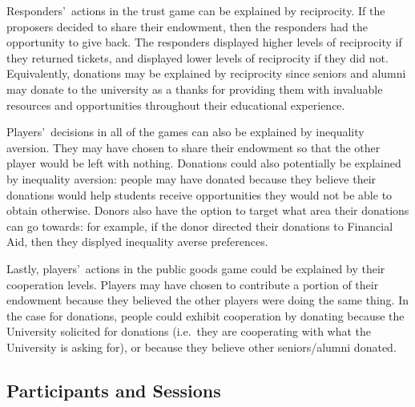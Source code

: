 \documentclass[12pt]{article}
\begin{document}
Responders\rq \ actions in the trust game can be explained by reciprocity. If the proposers decided to share their endowment, then the responders had the opportunity to give back. The responders displayed higher levels of reciprocity if they returned tickets, and displayed lower levels of reciprocity if they did not. 
Equivalently, donations may be explained by reciprocity since seniors and alumni may donate to the university as a thanks for providing them with invaluable resources and opportunities throughout their educational experience.

Players\rq \ decisions in all of the games can also be explained by inequality aversion. They may have chosen to share their endowment so that the other player would be left with nothing. Donations could also potentially be explained by inequality aversion: people may have donated because they believe their donations would help students receive opportunities they would not be able to obtain otherwise. Donors also have the option to target what area their donations can go towards: for example, if the donor directed their donations to Financial Aid, then they displyed inequality averse preferences.

Lastly, players\rq \ actions in the public goods game could be explained by their cooperation levels. Players may have chosen to contribute a portion of their endowment because they believed the other players were doing the same thing. In the case for donations, people could exhibit cooperation by donating because the University solicited for donations (i.e.\ they are cooperating with what the University is asking for), or because they believe other seniors/alumni donated.

	
\subsection{Participants and Sessions}
\end{document}
